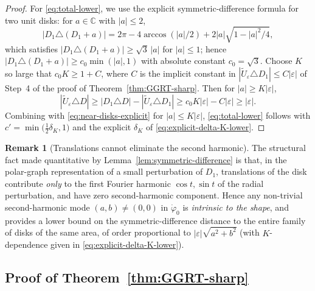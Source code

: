 \documentclass[a4paper,11pt,reqno]{amsart}
\numberwithin{equation}{section}
\theoremstyle{plain} %
\theoremstyle{definition} %
\newtheorem{remark}{Remark}[section]
\theoremstyle{remark}
\newcommand{\C}{\mathbb{C}}
\begin{document}
\begin{proof}
For \eqref{eq:total-lower}, we use the explicit symmetric-difference
formula for two unit disks: for \(a\in\C\) with \(|a|\le 2\),
\begin{equation}\label{eq:two-disks-symdif}
|D_1\triangle (D_1+a)|
=
2\pi-4\arccos(|a|/2)+2|a|\sqrt{1-|a|^2/4},
\end{equation}
which satisfies \(|D_1\triangle (D_1+a)|\ge \sqrt 3\,|a|\) for
\(|a|\le 1\); hence \(|D_1\triangle (D_1+a)|\ge c_0\min(|a|,1)\) with
absolute constant \(c_0=\sqrt 3\). Choose \(K\) so large that
\(c_0K\ge 1+C\), where \(C\) is the implicit constant in
\(|\widetilde U_\varepsilon\triangle D_1|\le C|\varepsilon|\) of Step~4 of
the proof of Theorem~\ref{thm:GGRT-sharp}. Then for \(|a|\ge K|\varepsilon|\),
\[
|\widetilde U_\varepsilon\triangle D|
\ge
|D_1\triangle D|-|\widetilde U_\varepsilon\triangle D_1|
\ge
c_0 K|\varepsilon|-C|\varepsilon|
\ge
|\varepsilon|.
\]
Combining with \eqref{eq:near-disks-explicit} for
\(|a|\le K|\varepsilon|\), \eqref{eq:total-lower} follows with
\(c'=\min\bigl(\tfrac 12\delta_K,1\bigr)\) and the explicit \(\delta_K\)
of \eqref{eq:explicit-delta-K-lower}.
\end{proof}

\begin{remark}[Translations cannot eliminate the second harmonic]
\label{rem:second-order-not-eliminated}
The structural fact made quantitative by
Lemma~\ref{lem:symmetric-difference} is that, in the polar-graph
representation of a small perturbation of \(D_1\), translations of the disk
contribute \emph{only} to the first Fourier harmonic \(\cos t,\sin t\) of
the radial perturbation, and have zero second-harmonic component. Hence any
non-trivial second-harmonic mode \((a,b)\neq (0,0)\) in \(\dot\varphi_0\)
is \emph{intrinsic to the shape}, and provides a lower bound on the
symmetric-difference distance to the entire family of disks of the same
area, of order proportional to \(|\varepsilon|\sqrt{a^2+b^2}\) (with
\(K\)-dependence given in \eqref{eq:explicit-delta-K-lower}).
\end{remark}

\subsection{Proof of Theorem~\ref{thm:GGRT-sharp}}
\label{subsec:GGRT-proof}
\end{document}
